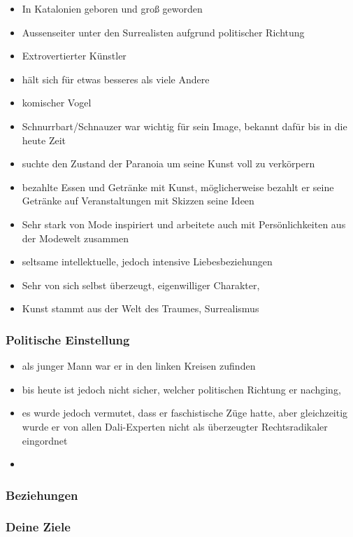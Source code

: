 \documentclass[12pt, a4paper, openany]{report}
\begin{document}
\begin{itemize}
  \item In Katalonien geboren und groß geworden
  \item Aussenseiter unter den Surrealisten aufgrund politischer Richtung
  \item Extrovertierter Künstler
  \item hält sich für etwas besseres als viele Andere
  \item komischer Vogel
  \item Schnurrbart/Schnauzer war wichtig für sein Image, bekannt dafür bis in die heute Zeit
  \item suchte den Zustand der Paranoia um seine Kunst voll zu verkörpern
  \item bezahlte Essen und Getränke mit Kunst, möglicherweise bezahlt er seine Getränke auf Veranstaltungen mit Skizzen seine Ideen
  \item Sehr stark von Mode inspiriert und arbeitete auch mit Persönlichkeiten aus der Modewelt zusammen
  \item seltsame intellektuelle, jedoch intensive Liebesbeziehungen 
  \item Sehr von sich selbst überzeugt, eigenwilliger Charakter, 
  \item Kunst stammt aus der Welt des Traumes, Surrealismus
\end{itemize}

\subsubsection{Politische Einstellung}

\begin{itemize}
  \item als junger Mann war er in den linken Kreisen zufinden
  \item bis heute ist jedoch nicht sicher, welcher politischen Richtung er nachging,  
  \item es wurde jedoch vermutet, dass er faschistische Züge hatte, aber gleichzeitig wurde er von allen Dali-Experten nicht als überzeugter Rechtsradikaler eingordnet
  \item   
  \end{itemize}
  
\subsubsection{Beziehungen}

\subsubsection{Deine Ziele}
\end{document}
